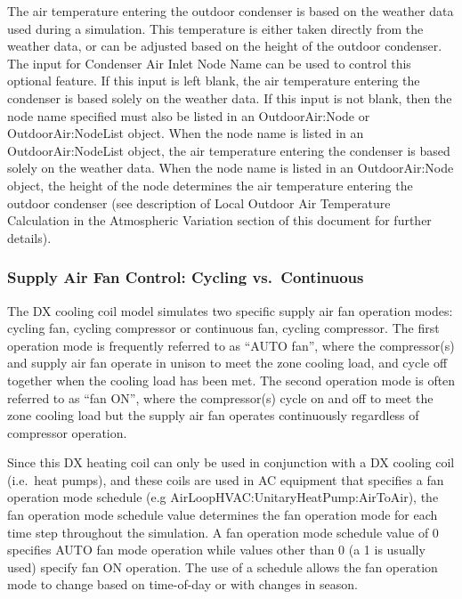 The air temperature entering the outdoor condenser is based on the weather data used during a simulation. This temperature is either taken directly from the weather data, or can be adjusted based on the height of the outdoor condenser. The input for Condenser Air Inlet Node Name can be used to control this optional feature. If this input is left blank, the air temperature entering the condenser is based solely on the weather data. If this input is not blank, then the node name specified must also be listed in an OutdoorAir:Node or OutdoorAir:NodeList object. When the node name is listed in an OutdoorAir:NodeList object, the air temperature entering the condenser is based solely on the weather data. When the node name is listed in an OutdoorAir:Node object, the height of the node determines the air temperature entering the outdoor condenser (see description of Local Outdoor Air Temperature Calculation in the Atmospheric Variation section of this document for further details).

\subsubsection{Supply Air Fan Control: Cycling vs.~Continuous}\label{supply-air-fan-control-cycling-vs.continuous}

The DX cooling coil model simulates two specific supply air fan operation modes: cycling fan, cycling compressor or continuous fan, cycling compressor. The first operation mode is frequently referred to as ``AUTO fan'', where the compressor(s) and supply air fan operate in unison to meet the zone cooling load, and cycle off together when the cooling load has been met. The second operation mode is often referred to as ``fan ON'', where the compressor(s) cycle on and off to meet the zone cooling load but the supply air fan operates continuously regardless of compressor operation.

Since this DX heating coil can only be used in conjunction with a DX cooling coil (i.e.~heat pumps), and these coils are used in AC equipment that specifies a fan operation mode schedule (e.g AirLoopHVAC:UnitaryHeatPump:AirToAir), the fan operation mode schedule value determines the fan operation mode for each time step throughout the simulation. A fan operation mode schedule value of 0 specifies AUTO fan mode operation while values other than 0 (a 1 is usually used) specify fan ON operation. The use of a schedule allows the fan operation mode to change based on time-of-day or with changes in season.

